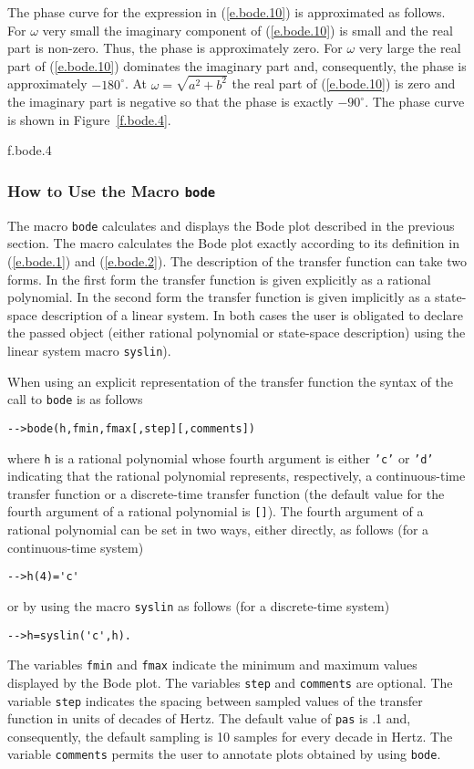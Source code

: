 	The phase curve for the expression in (\ref{e.bode.10})
is approximated as follows.  For $\omega$ very small the imaginary
component of (\ref{e.bode.10}) is small and the real part
is non-zero.  Thus, the phase is approximately zero.
For $\omega$ very large the real part of (\ref{e.bode.10}) dominates the
imaginary part and, consequently, the phase is approximately
$-180^{\circ}$.  At $\omega=\sqrt{a^2+b^2}$ the real part of (\ref{e.bode.10})
is zero and the imaginary part is negative so that the phase is exactly
$-90^{\circ}$.  The phase curve is shown in Figure~\ref{f.bode.4}.
%

{f.bode.4}

%

\subsubsection{How to Use the Macro {\tt bode}}

	The macro {\tt bode} calculates and displays the Bode plot
described in the previous section.  The macro calculates the
Bode plot exactly according to its definition in (\ref{e.bode.1}) and
(\ref{e.bode.2}).  The description of the transfer function can take
two forms.  In the first form the transfer function is given explicitly
as a rational polynomial.  In the second form the transfer function
is given implicitly as a state-space description of a linear system.  
In both cases
the user is obligated to declare the passed object (either rational polynomial
or state-space description) using the linear system
macro {\tt syslin}).

	When using an explicit representation of the transfer function
the syntax of the call to {\tt bode} is as follows
\begin{verbatim}
-->bode(h,fmin,fmax[,step][,comments])
\end{verbatim}
where {\tt h} is a rational polynomial whose fourth argument is
either {\tt 'c'} or {\tt 'd'} indicating that the rational polynomial
represents, respectively, a continuous-time transfer function or a
discrete-time transfer function (the default value for the 
fourth argument of a rational polynomial is {\tt []}).
The fourth argument of a rational polynomial 
can be set in two ways, either directly, as follows (for a continuous-time
system)
\begin{verbatim}
-->h(4)='c'
\end{verbatim}
or by using the macro {\tt syslin} as follows (for a discrete-time system)
\begin{verbatim}
-->h=syslin('c',h).
\end{verbatim}
The variables {\tt fmin} and {\tt fmax}
indicate the minimum and maximum values displayed by the Bode plot.
The variables {\tt step} and {\tt comments} are optional.  The variable
{\tt step} indicates the spacing between sampled values of the transfer
function in units of decades of Hertz.  The default value of {\tt pas}
is .1 and, consequently, the default sampling is 10 samples for every
decade in Hertz.  The variable {\tt comments} permits the user to
annotate plots obtained by using {\tt bode}.

